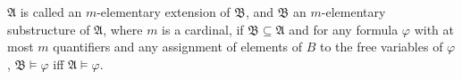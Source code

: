 $\mathfrak{A}$ is called an $m$-elementary extension of $\mathfrak{B}$, and $\mathfrak{B}$ an $m$-elementary substructure of $\mathfrak{A}$, where $m$ is a cardinal, if $\mathfrak{B} \subseteq \mathfrak{A}$ and for any formula $\varphi$ with at most $m$ quantifiers and any assignment of elements of $B$ to the free variables of $\varphi$, $\mathfrak{B} \models \varphi$ iff $\mathfrak{A} \models \varphi$.
